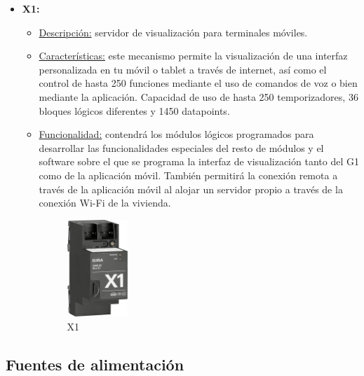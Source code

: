 \begin{itemize}
\item \textbf{X1:} 
	\begin{itemize}
	\item\underline{Descripción:} servidor de visualización para terminales móviles.
	\item \underline{Características:}  este mecanismo permite la visualización de una interfaz personalizada en tu móvil o tablet  a través de internet, así como el control de hasta 250 funciones mediante el uso de comandos de voz o bien mediante la aplicación. Capacidad de uso de hasta 250 temporizadores, 36 bloques lógicos diferentes y 1450 datapoints.
	\item \underline{Funcionalidad:} contendrá los módulos lógicos programados para desarrollar las funcionalidades especiales del resto de módulos y el software sobre el que se programa la interfaz de visualización tanto del G1 como de la aplicación móvil. También permitirá la conexión remota a través de la aplicación móvil al alojar un servidor propio a través de la conexión Wi-Fi de la vivienda.
	\begin{figure}[H]
	\centering
	\includegraphics[width=0.23\textwidth]{figures/x1.png}   
	\caption{X1}
	\label{fig:x1}
	\end{figure}
	\end{itemize} 
\end{itemize} 

\subsection{Fuentes de alimentación}

